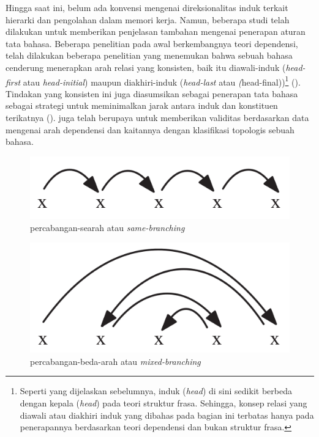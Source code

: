 Hingga saat ini, belum ada konvensi mengenai direksionalitas induk terkait hierarki dan pengolahan dalam memori kerja. Namun, beberapa studi telah dilakukan untuk memberikan penjelasan tambahan mengenai penerapan aturan tata bahasa. Beberapa penelitian pada awal berkembangnya teori dependensi, telah dilakukan beberapa penelitian yang menemukan bahwa sebuah bahasa cenderung menerapkan arah relasi yang konsisten, baik itu \gls{diawali-induk} (\textit{head-first} atau \textit{head-initial}) maupun \gls{diakhiri-induk} (\textit{head-last} atau \textit(head-final))\footnote{Seperti yang dijelaskan sebelumnya, induk (\textit{head}) di sini sedikit berbeda dengan kepala (\textit{head}) pada teori struktur frasa. Sehingga, konsep relasi yang diawali atau diakhiri induk yang dibahas pada bagian ini terbatas hanya pada penerapannya berdasarkan teori dependensi dan bukan struktur frasa.} (\citealp{hawkins1994performance, radford1997syntactic, vennemann1994linguistic}). Tindakan yang konsisten ini juga diasumsikan sebagai penerapan tata bahasa sebagai strategi untuk meminimalkan jarak antara induk dan konstituen terikatnya (\citealp{hawkins1994performance, frazier1985syntactic}). \cite{liu2010dependency} juga telah berupaya untuk memberikan validitas berdasarkan data mengenai arah dependensi dan kaitannya dengan klasifikasi topologis sebuah bahasa.

\begin{figure}
	\centering \includegraphics[width=0.5
	\textwidth] {pics/samebranching.png} \caption{\Gls{percabangan-searah} atau \textit{same-branching}} 
\label{fig:samebranching} \end{figure}

\begin{figure}
	\centering \includegraphics[width=0.5
	\textwidth] {pics/mixedbranching.png} \caption{\Gls{percabangan-beda-arah} atau \textit{mixed-branching}} 
\label{fig:mixedbranching} \end{figure}

